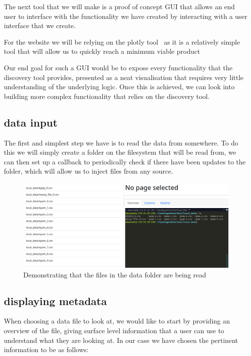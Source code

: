 The next tool that we will make is a proof of concept GUI that allows an end user to interface with the functionality
we have created by interacting with a user interface that we create.

For the website we will be relying on the plotly tool~\cite{plotlydash} as it is a relatively simple tool that will
allow us to quickly reach a minimum viable product

Our end goal for such a GUI would be to expose every functionality that the discovery tool provides, presented as a neat
visualisation that requires very little understanding of the underlying logic.
Once this is achieved, we can look into building more complex functionality that relies on the discovery tool.

\subsection{data input}\label{subsec:data-input}
The first and simplest step we have is to read the data from somewhere.
To do this we will simply create a folder on the filesystem that will be read from, we can then set up a callback
to periodically check if there have been updates to the folder, which will allow us to inject files from any source.

\begin{figure}[H]
    \centering
    \includegraphics[width=12cm]{figures/website_images/website_data_catalogue}
    \caption{Demonstrating that the files in the data folder are being read}\label{fig:catalogue_file_list}
\end{figure}

\subsection{displaying metadata}\label{subsec:displaying-metadata}
When choosing a data file to look at, we would like to start by providing an overview of the file, giving surface level
information that a user can use to understand what they are looking at.
In our case we have chosen the pertinent information to be as follows:

